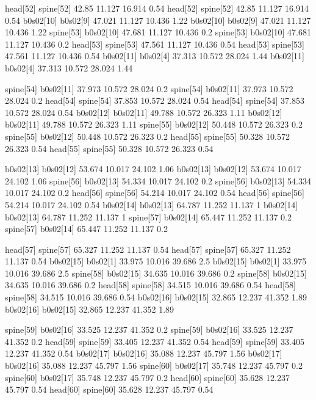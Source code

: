 head[52]    spine[52]    42.85    11.127    16.914    0.54
head[52]    spine[52]    42.85    11.127    16.914    0.54
b0s02[10]    b0s02[9]    47.021    11.127    10.436    1.22
b0s02[10]    b0s02[9]    47.021    11.127    10.436    1.22
spine[53]    b0s02[10]    47.681    11.127    10.436    0.2
spine[53]    b0s02[10]    47.681    11.127    10.436    0.2
head[53]    spine[53]    47.561    11.127    10.436    0.54
head[53]    spine[53]    47.561    11.127    10.436    0.54
b0s02[11]    b0s02[4]    37.313    10.572    28.024    1.44
b0s02[11]    b0s02[4]    37.313    10.572    28.024    1.44


spine[54]    b0s02[11]    37.973    10.572    28.024    0.2
spine[54]    b0s02[11]    37.973    10.572    28.024    0.2
head[54]    spine[54]    37.853    10.572    28.024    0.54
head[54]    spine[54]    37.853    10.572    28.024    0.54
b0s02[12]    b0s02[11]    49.788    10.572    26.323    1.11
b0s02[12]    b0s02[11]    49.788    10.572    26.323    1.11
spine[55]    b0s02[12]    50.448    10.572    26.323    0.2
spine[55]    b0s02[12]    50.448    10.572    26.323    0.2
head[55]    spine[55]    50.328    10.572    26.323    0.54
head[55]    spine[55]    50.328    10.572    26.323    0.54


b0s02[13]    b0s02[12]    53.674    10.017    24.102    1.06
b0s02[13]    b0s02[12]    53.674    10.017    24.102    1.06
spine[56]    b0s02[13]    54.334    10.017    24.102    0.2
spine[56]    b0s02[13]    54.334    10.017    24.102    0.2
head[56]    spine[56]    54.214    10.017    24.102    0.54
head[56]    spine[56]    54.214    10.017    24.102    0.54
b0s02[14]    b0s02[13]    64.787    11.252    11.137    1
b0s02[14]    b0s02[13]    64.787    11.252    11.137    1
spine[57]    b0s02[14]    65.447    11.252    11.137    0.2
spine[57]    b0s02[14]    65.447    11.252    11.137    0.2


head[57]    spine[57]    65.327    11.252    11.137    0.54
head[57]    spine[57]    65.327    11.252    11.137    0.54
b0s02[15]    b0s02[1]    33.975    10.016    39.686    2.5
b0s02[15]    b0s02[1]    33.975    10.016    39.686    2.5
spine[58]    b0s02[15]    34.635    10.016    39.686    0.2
spine[58]    b0s02[15]    34.635    10.016    39.686    0.2
head[58]    spine[58]    34.515    10.016    39.686    0.54
head[58]    spine[58]    34.515    10.016    39.686    0.54
b0s02[16]    b0s02[15]    32.865    12.237    41.352    1.89
b0s02[16]    b0s02[15]    32.865    12.237    41.352    1.89


spine[59]    b0s02[16]    33.525    12.237    41.352    0.2
spine[59]    b0s02[16]    33.525    12.237    41.352    0.2
head[59]    spine[59]    33.405    12.237    41.352    0.54
head[59]    spine[59]    33.405    12.237    41.352    0.54
b0s02[17]    b0s02[16]    35.088    12.237    45.797    1.56
b0s02[17]    b0s02[16]    35.088    12.237    45.797    1.56
spine[60]    b0s02[17]    35.748    12.237    45.797    0.2
spine[60]    b0s02[17]    35.748    12.237    45.797    0.2
head[60]    spine[60]    35.628    12.237    45.797    0.54
head[60]    spine[60]    35.628    12.237    45.797    0.54


